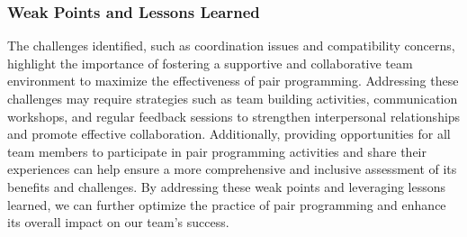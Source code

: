 \subsubsection{Weak Points and Lessons Learned} 
The challenges identified, such as coordination issues and compatibility concerns, highlight the importance of fostering a supportive and collaborative team environment to maximize the effectiveness of pair programming. Addressing these challenges may require strategies such as team building activities, communication workshops, and regular feedback sessions to strengthen interpersonal relationships and promote effective collaboration. \cite{team_building} Additionally, providing opportunities for all team members to participate in pair programming activities and share their experiences can help ensure a more comprehensive and inclusive assessment of its benefits and challenges. By addressing these weak points and leveraging lessons learned, we can further optimize the practice of pair programming and enhance its overall impact on our team's success.
